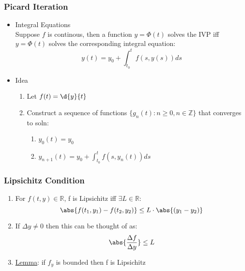 \documentclass[11pt]{article}
\begin{document}
\subsubsection{Picard Iteration}
\label{sec-9-1-4}
\begin{itemize}

\item Integral Equations\\
\label{sec-9-1-4-1}%
Suppose $f$ is continous, then a function $y=\Phi(t)$
     solves the IVP iff $y=\Phi(t)$ solves the corresponding integral equation:
     \begin{equation}
     y(t)=y_0+\int_{t_0}^t f(s,y(s))ds
     \end{equation}

\item Idea
\label{sec-9-1-4-2}%
\begin{enumerate}
\item Let $f(t) = \d{y}{t}$
\item Construct a sequence of functions $\{g_n(t) : n \geq 0, n\in \mathbb{Z}\}$ that converges to soln:
\begin{enumerate}
\item $y_0(t) = y_0$
\item $y_{n+1}(t)=y_0+ \int_{t_0}^tf(s,y_n(t))ds$
\end{enumerate}
\end{enumerate}
\end{itemize} %
\subsubsection{Lipsichitz Condition}
\label{sec-9-1-5}

\begin{enumerate}
\item For $f(t,y) \in \mathbb{R}$, f is Lipsichitz iff $\exists L\in \mathbb{R}$:
       \begin{equation}
       \abs{f(t_1,y_1)-f(t_2,y_2)} \leq L\cdot \abs{(y_1-y_2)}
       \end{equation}
\item If $\Delta y \neq 0$ then this can be thought of as:
       \begin{equation}
       \abs{\frac{\Delta f}{\Delta y}} \leq L
       \end{equation}
\item \underline{Lemma}: if $f_y$ is bounded then f is Lipsichitz
\end{enumerate}
\end{document}
